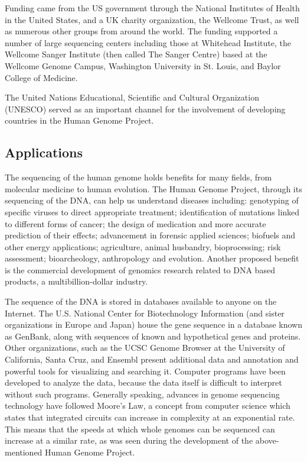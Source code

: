 \documentclass[12pt]{article}
\begin{document}
Funding came from the US government through the National Institutes of Health in the United States, and a UK charity organization, the Wellcome Trust, as well as numerous other groups from around the world. The funding supported a number of large sequencing centers including those at Whitehead Institute, the Wellcome Sanger Institute (then called The Sanger Centre) based at the Wellcome Genome Campus, Washington University in St. Louis, and Baylor College of Medicine.

The United Nations Educational, Scientific and Cultural Organization (UNESCO) served as an important channel for the involvement of developing countries in the Human Genome Project.

\subsection{Applications}

The sequencing of the human genome holds benefits for many fields, from molecular medicine to human evolution. The Human Genome Project, through its sequencing of the DNA, can help us understand diseases including: genotyping of specific viruses to direct appropriate treatment; identification of mutations linked to different forms of cancer; the design of medication and more accurate prediction of their effects; advancement in forensic applied sciences; biofuels and other energy applications; agriculture, animal husbandry, bioprocessing; risk assessment; bioarcheology, anthropology and evolution. Another proposed benefit is the commercial development of genomics research related to DNA based products, a multibillion-dollar industry.

The sequence of the DNA is stored in databases available to anyone on the Internet. The U.S. National Center for Biotechnology Information (and sister organizations in Europe and Japan) house the gene sequence in a database known as GenBank, along with sequences of known and hypothetical genes and proteins. Other organizations, such as the UCSC Genome Browser at the University of California, Santa Cruz, and Ensembl present additional data and annotation and powerful tools for visualizing and searching it. Computer programs have been developed to analyze the data, because the data itself is difficult to interpret without such programs. Generally speaking, advances in genome sequencing technology have followed Moore’s Law, a concept from computer science which states that integrated circuits can increase in complexity at an exponential rate. This means that the speeds at which whole genomes can be sequenced can increase at a similar rate, as was seen during the development of the above-mentioned Human Genome Project.
\end{document}
